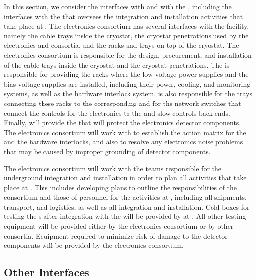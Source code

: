 In this section, we consider the interfaces with  %
and with the  , including the
interfaces with the  that oversees the integration
and installation activities that take place at .
The  electronics consortium has several
interfaces with the facility, namely the cable trays inside the
cryostat, the cryostat penetrations used by the  electronics
and  consortia, and the racks and trays on top
of the cryostat. The  electronics consortium is responsible
for the design, procurement, and installation of the cable trays
inside the cryostat and the cryostat penetrations. The 
 is responsible for providing the racks
where the low-voltage power supplies and the bias voltage supplies are installed,
including their power, cooling, and monitoring systems, as well as the hardware interlock system.
 is also responsible for the trays connecting these racks 
to the corresponding  and for the network switches that
connect the controls for the  electronics to the
 and slow controls back-ends. Finally,  will
provide the  that will protect
the  electronics detector components. The  electronics
consortium will work with  to establish
the action matrix for the  and the hardware
interlocks, and also to resolve any electronics noise problems
that may be caused by improper grounding of detector components.

The  electronics consortium will work with the teams responsible
for the underground integration and installation in order
to plan all activities that take place at .
This includes developing plans to outline the responsibilities
of the consortium and those of  personnel
for the activities at , including all 
shipments, transport, and logistics, as well as all
integration and installation. Cold boxes for testing
the s after integration with the  will be 
provided by  at .
All other testing equipment will be provided either by the  electronics
consortium or by other consortia. Equipment required to
minimize risk of  damage to the detector components
will  be provided by the  electronics consortium. 

\subsection{Other Interfaces}
\label{sec:fdsp-tpcelec-interfaces-other}

